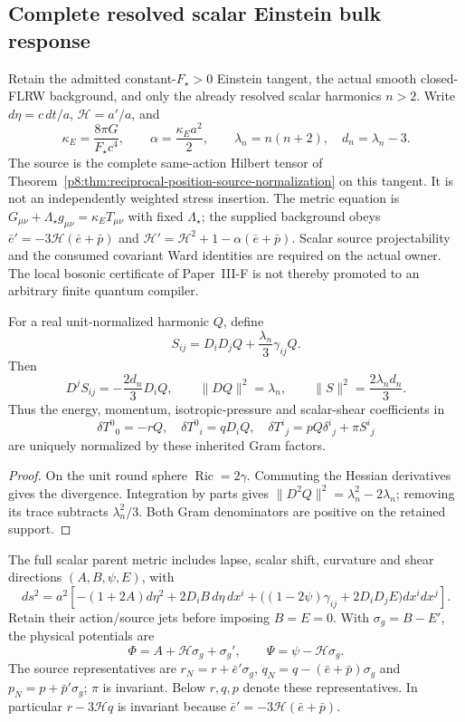 \documentclass[12pt,a4paper]{article}
\begin{document}
\subsection{Complete resolved scalar Einstein bulk response}
\label{p8:sec:v2147-full-scalar-einstein-bulk}

Retain the admitted constant-$F_\star>0$ Einstein tangent, the actual smooth
closed-FLRW background, and only the already resolved scalar harmonics $n>2$.
Write $d\eta=c\,dt/a$, $\mathcal H=a'/a$, and
\[
 \kappa_E=\frac{8\pi G}{F_\star c^4},\qquad
 \alpha=\frac{\kappa_Ea^2}{2},\qquad
 \lambda_n=n(n+2),\quad d_n=\lambda_n-3.
\]
The source is the complete same-action Hilbert tensor of
Theorem~\ref{p8:thm:reciprocal-position-source-normalization} on this tangent.
It is not an independently weighted stress insertion.  The metric equation is
$G_{\mu\nu}+\Lambda_\star g_{\mu\nu}=\kappa_E T_{\mu\nu}$
with fixed $\Lambda_\star$; the supplied background obeys
$\bar e'= -3\mathcal H(\bar e+\bar p)$ and
$\mathcal H'=\mathcal H^2+1-\alpha(\bar e+\bar p)$.  Scalar source
projectability and the consumed covariant Ward identities are required on the
actual owner.  The local bosonic certificate of Paper~III-F is not thereby
promoted to an arbitrary finite quantum compiler.

\begin{lemma}
\label{p8:lem:v2147-s3-full-scalar-stress-grams}
For a real unit-normalized harmonic $Q$, define
\[
 S_{ij}=D_iD_jQ+\frac{\lambda_n}{3}\gamma_{ij}Q.
\]
Then
\[
 D^jS_{ij}=-\frac{2d_n}{3}D_iQ,
 \qquad \|DQ\|^2=\lambda_n,
 \qquad \|S\|^2=\frac{2\lambda_nd_n}{3}.
\]
Thus the energy, momentum, isotropic-pressure and scalar-shear coefficients in
\[
 \delta T^0{}_0=-rQ,\quad \delta T^0{}_i=qD_iQ,\quad
 \delta T^i{}_j=pQ\delta^i{}_j+\pi S^i{}_j
\]
are uniquely normalized by these inherited Gram factors.
\end{lemma}
\begin{proof}
On the unit round sphere $\operatorname{Ric}=2\gamma$.
Commuting the Hessian derivatives gives the divergence.  Integration by parts
gives $\|D^2Q\|^2=\lambda_n^2-2\lambda_n$; removing its trace subtracts
$\lambda_n^2/3$.  Both Gram denominators are positive on the retained support.
\end{proof}

The full scalar parent metric includes lapse, scalar shift, curvature and shear
directions $(A,B,\psi,E)$, with
\[
 ds^2=a^2\left[-(1+2A)d\eta^2+2D_iB\,d\eta\,dx^i
 +\bigl((1-2\psi)\gamma_{ij}+2D_iD_jE\bigr)dx^idx^j\right].
\]
Retain their action/source jets before imposing
$B=E=0$.  With $\sigma_g=B-E'$, the physical potentials are
\[
 \Phi=A+\mathcal H\sigma_g+\sigma_g',\qquad
 \Psi=\psi-\mathcal H\sigma_g.
\]
The source representatives are $r_N=r+\bar e'\sigma_g$,
$q_N=q-(\bar e+\bar p)\sigma_g$ and $p_N=p+\bar p'\sigma_g$;
$\pi$ is invariant.  Below $r,q,p$ denote these representatives.
In particular $r-3\mathcal Hq$ is invariant because
$\bar e'=-3\mathcal H(\bar e+\bar p)$.
\end{document}
